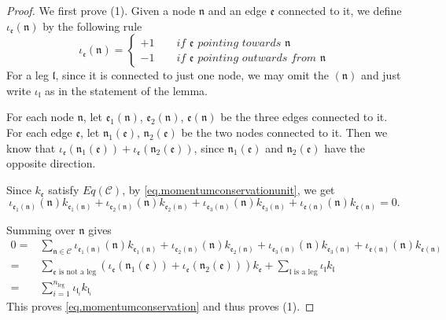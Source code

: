\begin{proof}
We first prove (1). Given a node $\mathfrak{n}$ and an edge $\mathfrak{e}$ connected to it, we define $\iota_{\mathfrak{e}}(\mathfrak{n})$ by the following rule
\begin{equation}
\iota_{\mathfrak{e}}(\mathfrak{n})=\begin{cases}
 +1 \qquad \textit{if $\mathfrak{e}$ pointing towards $\mathfrak{n}$}
 \\
 -1 \qquad \textit{if $\mathfrak{e}$ pointing outwards from $\mathfrak{n}$}
\end{cases}
\end{equation}
For a leg $\mathfrak{l}$, since it is connected to just one node, we may omit the $(\mathfrak{n})$ and just write $\iota_{\mathfrak{l}}$ as in the statement of the lemma.

For each node $\mathfrak{n}$, let $\mathfrak{e}_1(\mathfrak{n})$, $\mathfrak{e}_2(\mathfrak{n})$, $\mathfrak{e}(\mathfrak{n})$ be the three edges connected to it. For each edge $\mathfrak{e}$, let $\mathfrak{n}_1(\mathfrak{e})$, $\mathfrak{n}_2(\mathfrak{e})$ be the two nodes connected to it. Then we know that $\iota_{\mathfrak{e}}(\mathfrak{n}_1(\mathfrak{e}))+\iota_{\mathfrak{e}}(\mathfrak{n}_2(\mathfrak{e}))$, since $\mathfrak{n}_1(\mathfrak{e})$ and $\mathfrak{n}_2(\mathfrak{e})$ have the opposite direction. 

Since $k_{\mathfrak{e}}$ satisfy $Eq(\mathcal{C})$, by \eqref{eq.momentumconservationunit}, we get 
\begin{equation}
 \iota_{\mathfrak{e}_1(\mathfrak{n})}(\mathfrak{n})k_{\mathfrak{e}_1(\mathfrak{n})}+\iota_{\mathfrak{e}_2(\mathfrak{n})}(\mathfrak{n})k_{\mathfrak{e}_2(\mathfrak{n})}+\iota_{\mathfrak{e}_3(\mathfrak{n})}(\mathfrak{n})k_{\mathfrak{e}_3(\mathfrak{n})}+\iota_{\mathfrak{e}(\mathfrak{n})}(\mathfrak{n})k_{\mathfrak{e}(\mathfrak{n})}=0.
\end{equation}

Summing over $\mathfrak{n}$ gives 
\begin{equation}
\begin{split}
 0=&\sum_{\mathfrak{n}\in \mathcal{C}}\iota_{\mathfrak{e}_1(\mathfrak{n})}(\mathfrak{n})k_{\mathfrak{e}_1(\mathfrak{n})}+\iota_{\mathfrak{e}_2(\mathfrak{n})}(\mathfrak{n})k_{\mathfrak{e}_2(\mathfrak{n})}+\iota_{\mathfrak{e}_3(\mathfrak{n})}(\mathfrak{n})k_{\mathfrak{e}_3(\mathfrak{n})}+\iota_{\mathfrak{e}(\mathfrak{n})}(\mathfrak{n})k_{\mathfrak{e}(\mathfrak{n})}
 \\
 =& \sum_{\mathfrak{e}\text{ is not a leg}} 
 (\iota_{\mathfrak{e}}(\mathfrak{n}_1(\mathfrak{e}))+\iota_{\mathfrak{e}}(\mathfrak{n}_2(\mathfrak{e}))) k_{\mathfrak{e}}+ \sum_{\mathfrak{l}\text{ is a leg}} 
 \iota_{\mathfrak{l}} k_{\mathfrak{l}}
 \\
 =& \sum_{i=1}^{n_{\text{leg}}} \iota_{\mathfrak{l}_i}k_{\mathfrak{l}_i}
\end{split}
\end{equation}
This proves \eqref{eq.momentumconservation} and thus proves (1).


\end{proof}
